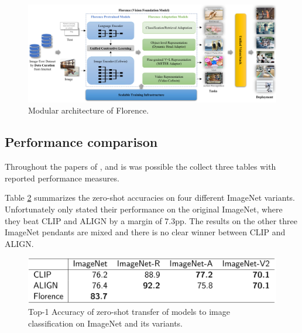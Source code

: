\documentclass[
]{krantz}
\begin{document}
\begin{figure}

{\centering \includegraphics[width=1\linewidth]{figures/02-04-text-support-img/florence-architecture} 

}

\caption{Modular architecture of Florence.}\label{fig:florence-architecture}
\end{figure}



\hypertarget{performanceComp}{%
\subsection{Performance comparison}\label{performanceComp}}

Throughout the papers of \citet{radford2021learning}, \citet{jia2021scaling} and \citet{yuan2021florence} is was possible the collect three tables with reported performance measures.

Table \ref{fig:table1} summarizes the zero-shot accuracies on four different ImageNet variants.
Unfortunately \citet{yuan2021florence} only stated their performance on the original ImageNet, where they beat CLIP and ALIGN by a margin of 7.3pp.
The results on the other three ImageNet pendants are mixed and there is no clear winner between CLIP and ALIGN.

\begin{figure}

{\centering \includegraphics[width=1\linewidth]{figures/02-04-text-support-img/table-imagenet} 

}

\caption{Top-1 Accuracy of zero-shot transfer of models to image classification on ImageNet and its variants.}\label{fig:table1}
\end{figure}
\end{document}
